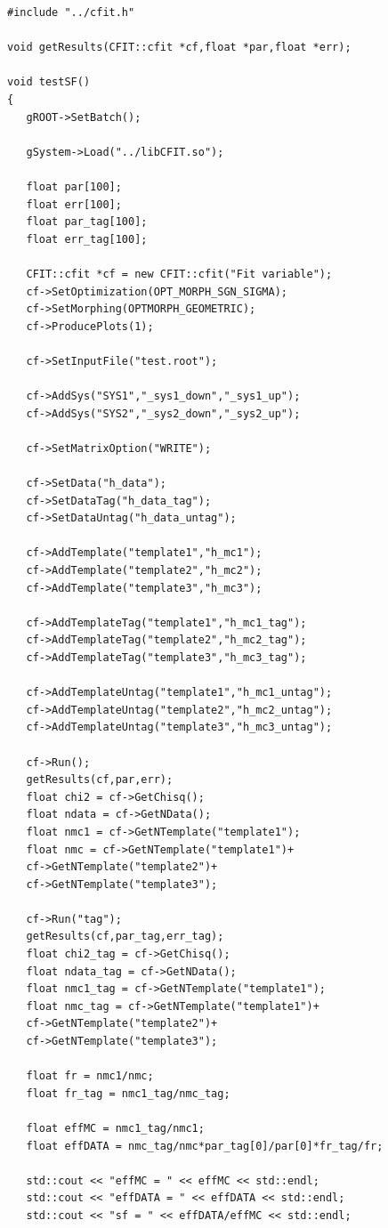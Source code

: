 \documentclass[12pt]{article}
\begin{document}
\begin{verbatim}
#include "../cfit.h"

void getResults(CFIT::cfit *cf,float *par,float *err);

void testSF()
{
   gROOT->SetBatch();
   
   gSystem->Load("../libCFIT.so");

   float par[100];
   float err[100];
   float par_tag[100];
   float err_tag[100];
   
   CFIT::cfit *cf = new CFIT::cfit("Fit variable");
   cf->SetOptimization(OPT_MORPH_SGN_SIGMA);
   cf->SetMorphing(OPTMORPH_GEOMETRIC);
   cf->ProducePlots(1);
   
   cf->SetInputFile("test.root");

   cf->AddSys("SYS1","_sys1_down","_sys1_up");
   cf->AddSys("SYS2","_sys2_down","_sys2_up");

   cf->SetMatrixOption("WRITE");
   
   cf->SetData("h_data");
   cf->SetDataTag("h_data_tag");
   cf->SetDataUntag("h_data_untag");
   
   cf->AddTemplate("template1","h_mc1");
   cf->AddTemplate("template2","h_mc2");
   cf->AddTemplate("template3","h_mc3");

   cf->AddTemplateTag("template1","h_mc1_tag");
   cf->AddTemplateTag("template2","h_mc2_tag");
   cf->AddTemplateTag("template3","h_mc3_tag");

   cf->AddTemplateUntag("template1","h_mc1_untag");
   cf->AddTemplateUntag("template2","h_mc2_untag");
   cf->AddTemplateUntag("template3","h_mc3_untag");
   
   cf->Run();   
   getResults(cf,par,err);
   float chi2 = cf->GetChisq();
   float ndata = cf->GetNData();
   float nmc1 = cf->GetNTemplate("template1");
   float nmc = cf->GetNTemplate("template1")+
   cf->GetNTemplate("template2")+
   cf->GetNTemplate("template3");

   cf->Run("tag");   
   getResults(cf,par_tag,err_tag);
   float chi2_tag = cf->GetChisq();
   float ndata_tag = cf->GetNData();
   float nmc1_tag = cf->GetNTemplate("template1");
   float nmc_tag = cf->GetNTemplate("template1")+
   cf->GetNTemplate("template2")+
   cf->GetNTemplate("template3");

   float fr = nmc1/nmc;
   float fr_tag = nmc1_tag/nmc_tag;
   
   float effMC = nmc1_tag/nmc1;
   float effDATA = nmc_tag/nmc*par_tag[0]/par[0]*fr_tag/fr;
   
   std::cout << "effMC = " << effMC << std::endl;
   std::cout << "effDATA = " << effDATA << std::endl;
   std::cout << "sf = " << effDATA/effMC << std::endl;


\end{verbatim}
\end{document}

